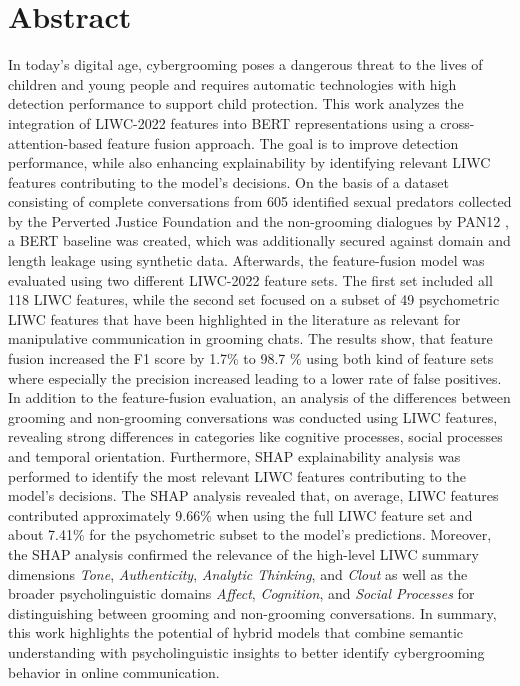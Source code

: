 \chapter{Abstract}

In today's digital age, cybergrooming poses a dangerous threat to the lives of children and young people and requires automatic technologies with high detection performance to support child protection. This work analyzes the integration of LIWC-2022 features \cite{pennebaker2022liwc} into BERT representations \cite{devlin2019bert} using a cross-attention-based feature fusion approach. The goal is to improve detection performance, while also enhancing explainability by identifying relevant LIWC features contributing to the model's decisions. On the basis of a dataset consisting of complete conversations from 605 identified sexual predators collected by the Perverted Justice Foundation and the  non-grooming dialogues by PAN12 \cite{inches2012pan}, a BERT baseline was created, which was additionally secured against domain and length leakage using synthetic data. Afterwards, the feature-fusion model was evaluated using two different LIWC-2022 feature sets. The first set included all 118 LIWC features, while the second set focused on a subset of 49 psychometric LIWC features that have been highlighted in the literature as relevant for manipulative communication in grooming chats. The results show, that feature fusion increased the F1 score by 1.7\% to 98.7 \% using both kind of feature sets where especially the precision increased leading to a lower rate of false positives. In addition to the feature-fusion evaluation, an analysis of the differences between grooming and non-grooming conversations was conducted using LIWC features, revealing strong differences in categories like cognitive processes, social processes and temporal orientation. Furthermore, SHAP \cite{lundberg2017shap} explainability analysis was performed to identify the most relevant LIWC features contributing to the model's decisions. The SHAP analysis revealed that, on average, LIWC features contributed approximately 9.66\% when using the full LIWC feature set and about 7.41\% for the psychometric subset to the model’s predictions. Moreover, the SHAP analysis confirmed the relevance of the high-level LIWC summary dimensions \textit{Tone}, \textit{Authenticity}, \textit{Analytic Thinking}, and \textit{Clout} as well as the broader psycholinguistic domains \textit{Affect}, \textit{Cognition}, and \textit{Social Processes} for distinguishing between grooming and non-grooming conversations. In summary, this work highlights the potential of hybrid models that combine semantic understanding with psycholinguistic insights to better identify cybergrooming behavior in online communication.
